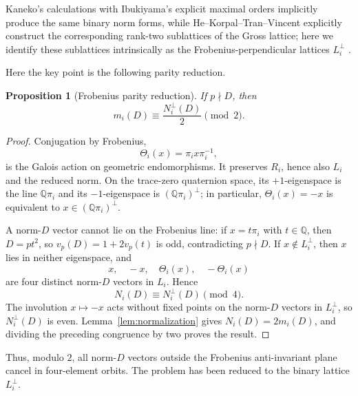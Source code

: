\documentclass[10pt,a4paper]{amsart}
\newtheorem{proposition}[theorem]{Proposition}
\newcommand{\Q}{\mathbb{Q}}
\begin{document}
Kaneko's calculations with Ibukiyama's explicit maximal orders implicitly
produce the same binary norm forms, while He--Korpal--Tran--Vincent
explicitly construct the corresponding rank-two sublattices of the Gross
lattice; here we identify these sublattices intrinsically as the
Frobenius-perpendicular lattices $L_i^\perp$
\cite{Kaneko1989,Ibukiyama1982,HeKorpalTranVincent}.

Here the key point is the following parity reduction.

\begin{proposition}[Frobenius parity reduction]\label{prop:four-orbit}
If $p\nmid D$, then
\[
  m_i(D)\equiv \frac{N_i^\perp(D)}2\pmod2.
\]
\end{proposition}

\begin{proof}
Conjugation by Frobenius,
\[
  \Theta_i(x)=\pi_i x\pi_i^{-1},
\]
is the Galois action on geometric endomorphisms.  It preserves $R_i$, hence also $L_i$ and the reduced norm.  On the trace-zero quaternion space, its $+1$-eigenspace is the line $\Q\pi_i$ and its $-1$-eigenspace is $(\Q\pi_i)^\perp$; in particular, $\Theta_i(x)=-x$ is equivalent to $x\in(\Q\pi_i)^\perp$.

A norm-$D$ vector cannot lie on the Frobenius line: if $x=t\pi_i$ with $t\in\Q$, then $D=pt^2$, so
$v_p(D)=1+2v_p(t)$ is odd, contradicting $p\nmid D$.  If $x\notin L_i^\perp$, then $x$ lies in neither eigenspace, and
\[
  x,\quad -x,\quad \Theta_i(x),\quad -\Theta_i(x)
\]
are four distinct norm-$D$ vectors in $L_i$.  Hence
\[
  N_i(D)\equiv N_i^\perp(D)\pmod4.
\]
The involution $x\mapsto-x$ acts without fixed points on the norm-$D$ vectors in $L_i^\perp$, so $N_i^\perp(D)$ is even.  Lemma~\ref{lem:normalization} gives $N_i(D)=2m_i(D)$, and dividing the preceding congruence by two proves the result.
\end{proof}

Thus, modulo $2$, all norm-$D$ vectors outside the Frobenius anti-invariant plane cancel in four-element orbits.  The problem has been reduced to the binary lattice $L_i^\perp$.
\end{document}
